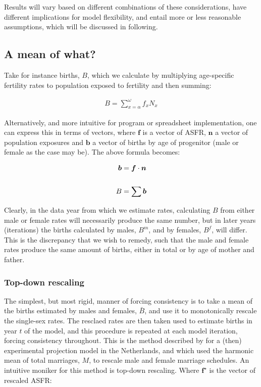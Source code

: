 Results will vary based on different combinations of these considerations, have different implications for model flexibility, and entail more or less reasonable assumptions, which will be discussed in following. 

\subsection{A mean of what?}
Take for instance births, $B$, which we calculate by multiplying age-specific fertility rates to population exposed to fertility and then summing:

\begin{align}
B = \sum _{x=\alpha} ^{\omega} f_x N_x
\end{align}

Alternatively, and more intuitive for program or spreadsheet implementation, one can express this in terms of vectors, where $\bm{f}$ is a vector of ASFR, $\bm{n}$ a vector of population exposures and $\bm{b}$ a vector of births by age of progenitor (male or female as the case may be). The above formula becomes:

\begin{align}
\bm{b} &= \bm{f}\cdot\bm{n} \notag \\ \notag \\
B &= \sum \bm{b}
\label{birthvec}
\end{align}

Clearly, in the data year from which we estimate rates, calculating $B$ from either male or female rates will necessarily produce the same number, but in later years (iterations) the births calculated by males, $B^m$, and by females, $B^f$, will differ. This is the discrepancy that we wish to remedy, such that the male and female rates produce the same amount of births, either in total or by age of mother and father.

\subsubsection{Top-down rescaling}
The simplest, but most rigid, manner of forcing consistency is to take a mean of the births estimated by males and females, $\bar{B}$, and use it to monotonically rescale the single-sex rates. The resclaed rates are then taken used to estimate births in year $t$ of the model, and this procedure is repeated at each model iteration, forcing consistency throughout. This is the method described by \citet{keilman1985nuptiality} for a (then) experimental projection model in the Netherlands, and which used the harmonic mean of total marriages, $M$, to rescale male and female marriage schedules. An intuitive moniker for this method is top-down rescaling. Where $\bm{f^{\star}}$ is the vector of rescaled ASFR:

